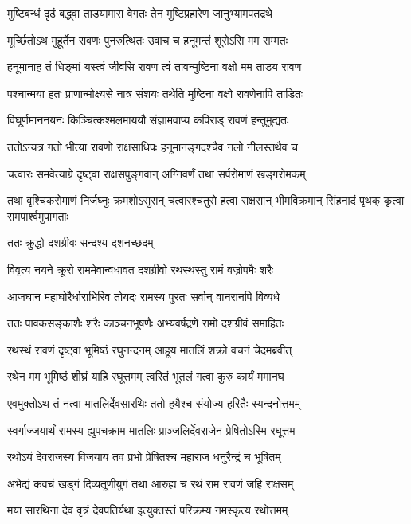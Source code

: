 \twolineshloka
{मुष्टिबन्धं दृढं बद्ध्वा ताडयामास वेगतः}
{तेन मुष्टिप्रहारेण जानुभ्यामपतद्रथे} %

\twolineshloka
{मूर्च्छितोऽथ मुहूर्तेन रावणः पुनरुत्थितः}
{उवाच च हनूमन्तं शूरोऽसि मम सम्मतः} %

\twolineshloka
{हनूमानाह तं धिङ्मां यस्त्वं जीवसि रावण}
{त्वं तावन्मुष्टिना वक्षो मम ताडय रावण} %

\twolineshloka
{पश्चान्मया हतः प्राणान्मोक्ष्यसे नात्र संशयः}
{तथेति मुष्टिना वक्षो रावणेनापि ताडितः} %

\twolineshloka
{विघूर्णमाननयनः किञ्चित्कश्मलमाययौ}
{संज्ञामवाप्य कपिराड् रावणं हन्तुमुद्यतः} %

\twolineshloka
{ततोऽन्यत्र गतो भीत्या रावणो राक्षसाधिपः}
{हनूमानङ्गदश्चैव नलो नीलस्तथैव च} %

\twolineshloka
{चत्वारः समवेत्याग्रे दृष्ट्वा राक्षसपुङ्गवान्}
{अग्निवर्णं तथा सर्परोमाणं खड्गरोमकम्} %

\threelineshloka
{तथा वृश्चिकरोमाणं निर्जघ्नुः क्रमशोऽसुरान्}
{चत्वारश्चतुरो हत्वा राक्षसान् भीमविक्रमान्}
{सिंहनादं पृथक् कृत्वा रामपार्श्वमुपागताः} %

{ततः क्रुद्धो दशग्रीवः सन्दश्य दशनच्छदम्} %


\twolineshloka
{विवृत्य नयने क्रूरो राममेवान्वधावत}
{दशग्रीवो रथस्थस्तु रामं वज्रोपमैः शरैः} %

\twolineshloka
{आजघान महाघोरैर्धाराभिरिव तोयदः}
{रामस्य पुरतः सर्वान् वानरानपि विव्यधे} %

\twolineshloka
{ततः पावकसङ्काशैः शरैः काञ्चनभूषणैः}
{अभ्यवर्षद्रणे रामो दशग्रीवं समाहितः} %

\twolineshloka
{रथस्थं रावणं दृष्ट्वा भूमिष्ठं रघुनन्दनम्}
{आहूय मातलिं शक्रो वचनं चेदमब्रवीत्} %

\twolineshloka
{रथेन मम भूमिष्ठं शीघ्रं याहि रघूत्तमम्}
{त्वरितं भूतलं गत्वा कुरु कार्यं ममानघ} %

\twolineshloka
{एवमुक्तोऽथ तं नत्वा मातलिर्देवसारथिः}
{ततो हयैश्च संयोज्य हरितैः स्यन्दनोत्तमम्} %

\twolineshloka
{स्वर्गाज्जयार्थं रामस्य ह्युपचक्राम मातलिः}
{प्राञ्जलिर्देवराजेन प्रेषितोऽस्मि रघूत्तम} %

\twolineshloka
{रथोऽयं देवराजस्य विजयाय तव प्रभो}
{प्रेषितश्च महाराज धनुरैन्द्रं च भूषितम्} %

\twolineshloka
{अभेद्यं कवचं खड्गं दिव्यतूणीयुगं तथा}
{आरुह्य च रथं राम रावणं जहि राक्षसम्} %

\twolineshloka
{मया सारथिना देव वृत्रं देवपतिर्यथा}
{इत्युक्तस्तं परिक्रम्य नमस्कृत्य रथोत्तमम्} %

